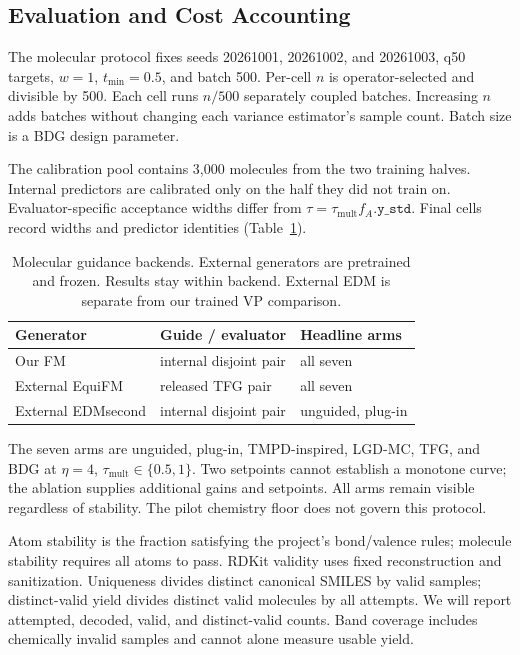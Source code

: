 \documentclass{article}
\begin{document}
\subsection{Evaluation and Cost Accounting}\label{app:evaluation}
The molecular protocol fixes seeds 20261001, 20261002, and 20261003, q50 targets, $w=1$, $t_{\min}=0.5$, and batch 500. Per-cell $n$ is operator-selected and divisible by 500. Each cell runs $n/500$ separately coupled batches. Increasing $n$ adds batches without changing each variance estimator's sample count. Batch size is a BDG design parameter.

The calibration pool contains 3{,}000 molecules from the two training halves. Internal predictors are calibrated only on the half they did not train on. Evaluator-specific acceptance widths differ from $\tau=\tau_{\mathrm{mult}}f_A.\texttt{y\_std}$. Final cells record widths and predictor identities (Table~\ref{tab:backends}).

\begin{table}[!htbp]
\centering\small
\caption{Molecular guidance backends. External generators are pretrained and frozen. Results stay within backend. External EDM is separate from our trained VP comparison.}
\label{tab:backends}
\begin{tabular}{lll}
\toprule
Generator & Guide / evaluator & Headline arms\\
\midrule
Our FM & internal disjoint pair & all seven\\
External EquiFM & released TFG pair & all seven\\
External EDMsecond & internal disjoint pair & unguided, plug-in\\
\bottomrule
\end{tabular}
\end{table}

The seven arms are unguided, plug-in, TMPD-inspired, LGD-MC, TFG, and BDG at $\eta=4$, $\tau_{\mathrm{mult}}\in\{0.5,1\}$. Two setpoints cannot establish a monotone curve; the ablation supplies additional gains and setpoints. All arms remain visible regardless of stability. The pilot chemistry floor does not govern this protocol.

Atom stability is the fraction satisfying the project's bond/valence rules; molecule stability requires all atoms to pass. RDKit validity uses fixed reconstruction and sanitization. Uniqueness divides distinct canonical SMILES by valid samples; distinct-valid yield divides distinct valid molecules by all attempts. We will report attempted, decoded, valid, and distinct-valid counts. Band coverage includes chemically invalid samples and cannot alone measure usable yield.
\end{document}
